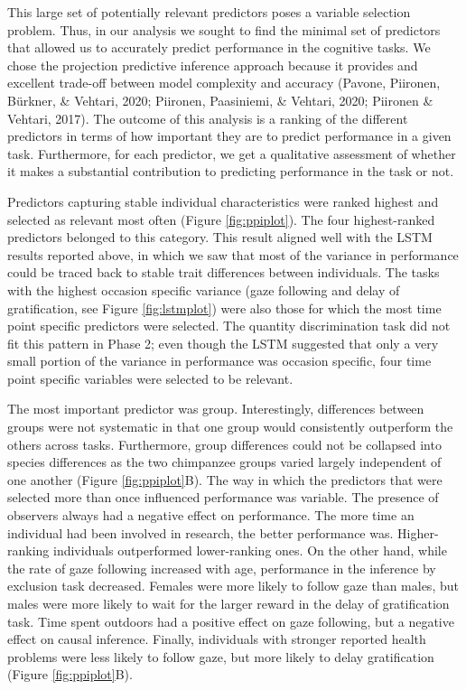 \documentclass[
  man,floatsintext]{apa6}
\begin{document}
This large set of potentially relevant predictors poses a variable selection problem. Thus, in our analysis we sought to find the minimal set of predictors that allowed us to accurately predict performance in the cognitive tasks. We chose the projection predictive inference approach because it provides and excellent trade-off between model complexity and accuracy (Pavone, Piironen, Bürkner, \& Vehtari, 2020; Piironen, Paasiniemi, \& Vehtari, 2020; Piironen \& Vehtari, 2017). The outcome of this analysis is a ranking of the different predictors in terms of how important they are to predict performance in a given task. Furthermore, for each predictor, we get a qualitative assessment of whether it makes a substantial contribution to predicting performance in the task or not.

Predictors capturing stable individual characteristics were ranked highest and selected as relevant most often (Figure \ref{fig:ppiplot}). The four highest-ranked predictors belonged to this category. This result aligned well with the LSTM results reported above, in which we saw that most of the variance in performance could be traced back to stable trait differences between individuals. The tasks with the highest occasion specific variance (gaze following and delay of gratification, see Figure \ref{fig:lstmplot}) were also those for which the most time point specific predictors were selected. The quantity discrimination task did not fit this pattern in Phase 2; even though the LSTM suggested that only a very small portion of the variance in performance was occasion specific, four time point specific variables were selected to be relevant.

The most important predictor was group. Interestingly, differences between groups were not systematic in that one group would consistently outperform the others across tasks. Furthermore, group differences could not be collapsed into species differences as the two chimpanzee groups varied largely independent of one another (Figure \ref{fig:ppiplot}B). The way in which the predictors that were selected more than once influenced performance was variable. The presence of observers always had a negative effect on performance. The more time an individual had been involved in research, the better performance was. Higher-ranking individuals outperformed lower-ranking ones. On the other hand, while the rate of gaze following increased with age, performance in the inference by exclusion task decreased. Females were more likely to follow gaze than males, but males were more likely to wait for the larger reward in the delay of gratification task. Time spent outdoors had a positive effect on gaze following, but a negative effect on causal inference. Finally, individuals with stronger reported health problems were less likely to follow gaze, but more likely to delay gratification (Figure \ref{fig:ppiplot}B).
\end{document}
